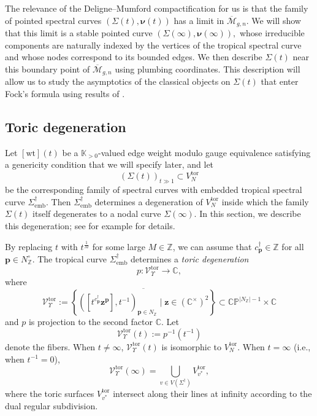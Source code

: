 \documentclass[12pt]{amsart}
\numberwithin{equation}{section}
\theoremstyle{definition}
\newcommand{\Z}{\mathbb{Z}}
\newcommand{\C}{\mathbb{C}}
\def\vertices{V}
\newcommand{\wt}{\mathrm{wt}}
\newcommand{\ra}{\rightarrow}
\def\Puis{\mathbb K}
\def\Puispos{\Puis_{>0}}
\def\trop{\dagger}
\def\toricsurface{V_N^{\mathrm{tor}}}
\def\toricsurfacesmall{V^{\mathrm{tor}}}
\def\toricsurfacedegeneration{\mathcal V_\Subd^\mathrm{tor}}
\def\toricsurfacedegenerationfibert{\mathcal V_{\Subd}^\mathrm{tor}(t)}
\def\toricsurfacedegenerationfiberzero{\mathcal V_{\Subd}^\mathrm{tor}(\infty)}
\def\spectralcurve{\Sigma}
\def\degeneratecurve{\Sigma(\infty)}
\def\pt{{\bm{p}}} %
\def\ptC{{\bm{z}}} %
\def\NZ{N_{\Z}}
\def\NZo{N^\circ_{\Z}}
\def\hei{c^{\trop}}
\def\Subd{\Upsilon}
\def\mcurve{\Sigma}
\def\tropmcurve{\mcurve^\trop}
\begin{document}
The relevance of the Deligne--Mumford compactification for us is that
the family of pointed spectral curves
$
(\mcurve(t),\bm\nu(t))
$
has a limit in $\overline{\mathcal M}_{g,n}$. We will show that this
limit is a stable pointed curve
$
(\mcurve(\infty),\bm\nu(\infty)),
$
whose irreducible components are naturally indexed by the vertices of
the tropical spectral curve and whose nodes correspond to its bounded
edges. We then describe $\mcurve(t)$ near this boundary point of
$\overline{\mathcal M}_{g,n}$ using plumbing coordinates. This
description will allow us to study the asymptotics of the classical
objects on $\mcurve(t)$ that enter Fock's formula using results of \cite{HuNorton}.


\subsection{Toric degeneration}
\label{sec:degenerate_curve}

Let $[\wt](t)$ be a $\Puispos$-valued edge weight modulo gauge
equivalence satisfying a genericity condition that we will specify
later, and let
\[
(\spectralcurve(t))_{t\gg1}\subset\toricsurface
\]
be the corresponding family of spectral curves with embedded tropical
spectral curve $\tropmcurve_{\mathrm{emb}}$. Then
$\tropmcurve_{\mathrm{emb}}$ determines a degeneration of
$\toricsurface$ inside which the family $\spectralcurve(t)$ itself
degenerates to a nodal curve $\degeneratecurve$. In this section, we
describe this degeneration; see for example
\cite[Section~6.6]{MaclaganSturmfels} for details.

By replacing $t$ with $t^{\frac1M}$ for some large $M\in\Z$, we can
assume that $\hei_\pt\in\Z$ for all $\pt\in\NZo$. The tropical curve
$\tropmcurve_{\mathrm{emb}}$ determines a \emph{toric degeneration}
\[
p:\toricsurfacedegeneration\ra\C,
\]
where
\[
\toricsurfacedegeneration
:=
\overline{
\left\{
([t^{\hei_\pt}\ptC^\pt],t^{-1})_{\pt\in\NZ}
\mid
\ptC\in(\C^\times)^2
\right\}}
\subset
\C\mathbb P^{|\NZ|-1}\times\C
\]
and $p$ is projection to the second factor $\C$. Let
\[
\toricsurfacedegenerationfibert:=p^{-1}(t^{-1})
\]
denote the fibers. When $t\neq\infty$,
$\toricsurfacedegenerationfibert$ is isomorphic to $\toricsurface$.
When $t=\infty$ (i.e., when $t^{-1}=0$),
\[
\toricsurfacedegenerationfiberzero
=
\bigcup_{v\in\vertices(\tropmcurve)}
\toricsurfacesmall_{v^*},
\]
where the toric surfaces $\toricsurfacesmall_{v^*}$ intersect along
their lines at infinity according to the dual regular subdivision.
\end{document}
